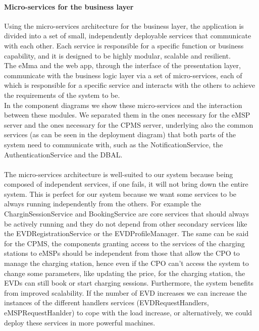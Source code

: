 \paragraph{Micro-services for the business layer}
Using the micro-services architecture for the business layer, the application is divided into a set of small, independently deployable services that communicate with each other. Each service is responsible for a specific function or business capability, and it is designed to be highly modular, scalable and resilient.\\
The eMma and the web app, through the interface of the presentation layer, communicate with the business logic layer via a set of micro-services, each of which is responsible for a specific service and interacts with the others to achieve the requirements of the system to be.\\
In the component diagrams we show these micro-services and the interaction between these modules. We separated them in the ones necessary for the eMSP server and the ones necessary for the CPMS server, underlying also the common services (as can be seen in the deployment diagram) that both parts of the system need to communicate with, such as the NotificationService, the AuthenticationService and the DBAL.\\\\
The micro-services architecture is well-suited to our system because being composed of independent services, if one fails, it will not bring down the entire system. This is perfect for our system because we want some services to be always running independently from the others. For example the CharginSessionService and BookingService are core services that should always be actively running and they do not depend from other secondary services like the EVDRegistrationService or the EVDProfileManager. The same can be said for the CPMS, the components granting access to the services of the charging stations to eMSPs should be independent from those that allow the CPO to manage the charging station, hence even if the CPO can't access the system to change some parameters, like updating the price, for the charging station, the EVDs can still book or start charging sessions. Furthermore, the system benefits from improved scalability. If the number of EVD increases we can increase the instances of the different handlers services (EVDRequestHandlers, eMSPRequestHanlder) to cope with the load increase, or alternatively, we could deploy these services in more powerful machines.

